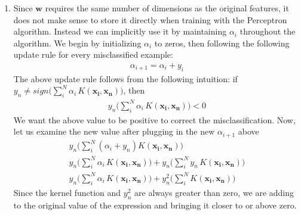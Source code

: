 \documentclass[12pt]{article}
\begin{document}
\begin{enumerate}[label=\alph*.]
	\item Since $\mathbf{w}$ requires the same number of dimensions as the original features, it does not make sense to store it directly when training with the Perceptron algorithm. Instead we can implicitly use it by maintaining $\alpha_i$ throughout the algorithm. We begin by initializing $\alpha_i$ to zeros, then following the following update rule for every misclassified example:
	\begin{gather*}
		\alpha_{i+1} = \alpha_i + y_i
	\end{gather*}
	The above update rule follows from the following intuition: if $y_n \neq sign \bigg( \sum^N_{i}{\alpha_i \, K( \mathbf{x_i}, \mathbf{x_n} )} \bigg) $,  then 
	\begin{gather*}
		y_n \bigg( \sum^N_{i}{\alpha_i \, K( \mathbf{x_i}, \mathbf{x_n} )} \bigg) < 0
	\end{gather*}
	We want the above value to be positive to correct the misclassification. Now, let us examine the new value after plugging in the new $\alpha_{i+1}$ above
	\begin{gather*}
		y_n \bigg( \sum^N_{i}{(\alpha_i + y_n) K( \mathbf{x_i}, \mathbf{x_n} )} \bigg) \\ 
		y_n \bigg( \sum^N_{i}{\alpha_i \, K( \mathbf{x_i}, \mathbf{x_n} )} \bigg) + y_n \bigg( \sum^N_{i}{y_n \, K( \mathbf{x_i}, \mathbf{x_n} )} \bigg) \\
		y_n \bigg( \sum^N_{i}{\alpha_i \, K( \mathbf{x_i}, \mathbf{x_n} )} \bigg) + y_n^2 \bigg( \sum^N_{i}{ K( \mathbf{x_i}, \mathbf{x_n} )} \bigg)
	\end{gather*}
	Since the kernel function and $y_n^2$ are always greater than zero, we are adding to the original value of the expression and bringing it closer to or above zero.
\end{enumerate}
\end{document}
